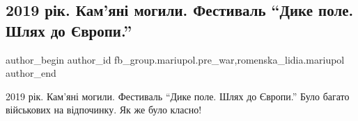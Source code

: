  
 
 
 
 

\subsection{2019 рік. Кам'яні могили. Фестиваль \enquote{Дике поле. Шлях до Європи.}}
\label{sec:13_02_2023.fb.fb_group.mariupol.pre_war.4.2019_r_k__kam_yan__m}
 
\ifcmt
 author_begin
   author_id fb_group.mariupol.pre_war,romenska_lidia.mariupol
 author_end
\fi

2019 рік. Кам'яні могили. Фестиваль \enquote{Дике поле. Шлях до Європи.} Було
багато військових на відпочинку. Як же було класно!
